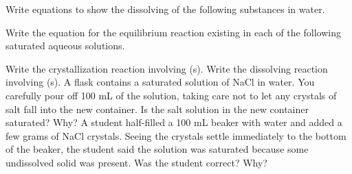 \documentclass[fleqn]{exam}
\begin{document}
\begin{questions}
  \question Write equations to show the dissolving of the following substances in water.
  \newpage

  \question Write the equation for the equilibrium reaction existing in each of the following saturated aqueous solutions.

  \question Write the crystallization reaction involving (s).
  \vspace{1.5in}
  \question Write the dissolving reaction involving (s).
  \vspace{1.5in}
  \question A flask contains a saturated solution of NaCl in water. You carefully pour off 100 mL of the solution, taking care not to let any crystals of salt fall into the new container. Is the salt solution in the new  container saturated? Why?
  \vspace{1.5in}
  \question A student half-filled a 100 mL beaker with water and added a few grams of NaCl crystals. Seeing the crystals settle immediately to the bottom of the beaker, the student said the solution was saturated  because some undissolved solid was present. Was the student correct? Why?

\end{questions}
\end{document}
